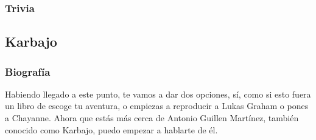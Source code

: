 \documentclass[letterpaper]{article}
\begin{document}
\subsubsection{Trivia}


\subsection{Karbajo}

\subsubsection{Biografía}

Habiendo llegado a este punto, te vamos a dar dos opciones, sí, como si esto fuera un libro de escoge tu aventura, o empiezas a reproducir a Lukas Graham o pones a 
Chayanne. Ahora que estás más cerca de Antonio Guillen Martínez, también conocido como Karbajo, puedo empezar a hablarte de él.\\
\end{document}
